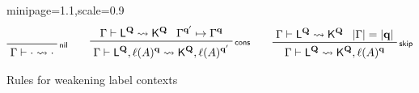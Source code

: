 \documentclass[acmsmall,screen,anonymous,review]{acmart}
\newcommand{\mb}[1]{\ensuremath{\mathbf{#1}}}
\newcommand{\ms}[1]{\ensuremath{\mathsf{#1}}}
\newcommand{\cwk}[2]{#1 \mapsto #2}
\newcommand{\lwk}[3]{#1 \vdash #2 \rightsquigarrow #3}
\newcommand{\lhyp}[2]{#1(#2)}
\newcommand{\rle}[1]{{\scriptsize\textsf{#1}}}
\begin{document}
\begin{figure}
  \begin{adjustbox}{minipage=1.1\textwidth,scale=0.9}
  \begin{gather*}
    \prftree[r]{\rle{nil}}{\lwk{\Gamma}{\cdot}{\cdot}} \qquad 
    \prftree[r]{\rle{cons}}
      {\lwk{\Gamma}{\ms{L}^{\mb{Q}}}{\ms{K}^{\mb{Q}}}}
      {\cwk{\Gamma^{\mb{q}'}}{\Gamma^{\mb{q}}}}
      {\lwk{\Gamma}{\ms{L}^{\mb{Q}}, \lhyp{\ell}{A}^{\mb{q}}}
      {\ms{K}^{\mb{Q}}, \lhyp{\ell}{A}^{\mb{q}'}}} \qquad
    \prftree[r]{\rle{skip}}
      {\lwk{\Gamma}{\ms{L}^{\mb{Q}}}{\ms{K}^{\mb{Q}}}}
      {|\Gamma| = |\mb{q}|}
      {\lwk{\Gamma}{\ms{L}^{\mb{Q}}}{\ms{K}^{\mb{Q}}, \lhyp{\ell}{A}^{\mb{q}}}}
  \end{gather*}
  \end{adjustbox}
  \caption{Rules for weakening label contexts}
  \Description{}
  \label{fig:label-wk}
\end{figure}
\end{document}
